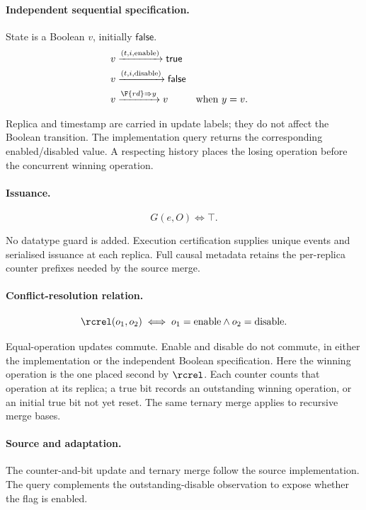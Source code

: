 \paragraph{Independent sequential specification.}
State is a Boolean $v$, initially $\mathsf{false}$.
\[
\begin{aligned}
v&\xrightarrow{(t,i,\mathrm{enable})}\mathsf{true}\\
v&\xrightarrow{(t,i,\mathrm{disable})}\mathsf{false}\\
v&\xrightarrow{\F{rd}\Rightarrow y}v&&\text{when }y=v.
\end{aligned}
\]

Replica and timestamp are carried in update labels; they do not affect the Boolean transition. The implementation query returns the corresponding enabled/disabled value. A respecting history places the losing operation before the concurrent winning operation.


\paragraph{Issuance.}
\[
G(e,O)\iff\top.
\]

No datatype guard is added. Execution certification supplies unique events and serialised issuance at each replica. Full causal metadata retains the per-replica counter prefixes needed by the source merge.


\paragraph{Conflict-resolution relation.}
\[
\rcrel(o_1,o_2)\iff o_1=\mathrm{enable}\land o_2=\mathrm{disable}.
\]

Equal-operation updates commute. Enable and disable do not commute, in either the implementation or the independent Boolean specification. Here the winning operation is the one placed second by $\rcrel$. Each counter counts that operation at its replica; a true bit records an outstanding winning operation, or an initial true bit not yet reset. The same ternary merge applies to recursive merge bases.


\paragraph{Source and adaptation.}
The counter-and-bit update and ternary merge follow the source implementation. The query complements the outstanding-disable observation to expose whether the flag is enabled.



